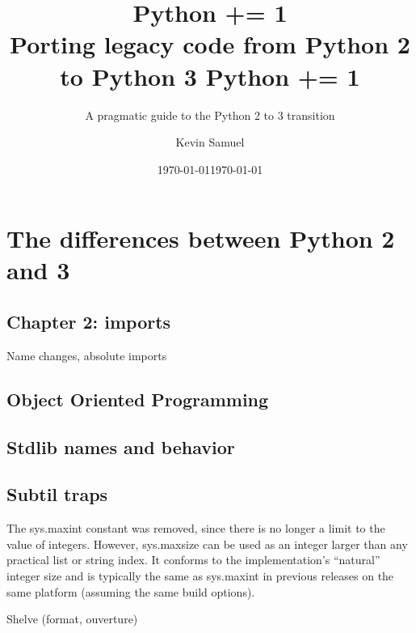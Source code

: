\documentclass[paperwidth=8in, paperheight=10in,lang=en]{elegantbook}
\title{
  Python += 1 \\
  \large Porting legacy code from Python 2 to Python 3
}
\title{Python += 1}
\subtitle{A pragmatic guide to the Python 2 to 3 transition}
\institute{Bite Code}
\date{\today}
\author{Kevin Samuel}
\date{\today}
\begin{document}
\maketitle

\frontmatter

\tableofcontents



\mainmatter

\hypersetup{pageanchor=true}

\part{The differences between Python 2 and 3}







\chapter{Chapter 2: imports}

Name changes, absolute imports




\chapter{Object Oriented Programming}\label{chap:oop}

\chapter{Stdlib names and behavior}

\chapter{Subtil traps}

The sys.maxint constant was removed, since there is no longer a limit to the value of integers. However, sys.maxsize can be used as an integer larger than any practical list or string index. It conforms to the implementation’s “natural” integer size and is typically the same as sys.maxint in previous releases on the same platform (assuming the same build options).

Shelve (format, ouverture)
\end{document}
